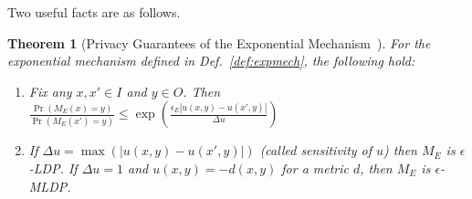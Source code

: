 \documentclass[11pt]{article}
\newtheorem{theorem}{Theorem}
\begin{document}
Two useful facts are as follows.

\begin{theorem}[Privacy Guarantees of the Exponential Mechanism~\cite{mcsherry2007mechanism,yue2021differential}]\label{thm:exp_mech_privacy}
    For the exponential mechanism defined in Def.~\ref{def:expmech}, the following hold:
    \begin{enumerate}
    \setlength\itemsep{0em}

        \item Fix any $x, x' \in I$ and $y\in O$. Then 
        $
            \frac{\Pr(M_E(x) = y)}{\Pr(M_E(x') = y)} \leq \exp\left(\frac{\epsilon_E |u(x, y) - u(x', y)|}{\Delta u}\right)
        $
        \item If $\Delta u = \max\left(|u(x, y) - u(x', y)| \right)$ (called {\em sensitivity} of $u$) then $M_E$ is $\epsilon$-LDP. If $\Delta u = 1$ and $u(x,y) = -d(x,y)$ for a metric $d$, then $M_E$ is $\epsilon$-MLDP.
    \end{enumerate}
\end{theorem}
\end{document}
